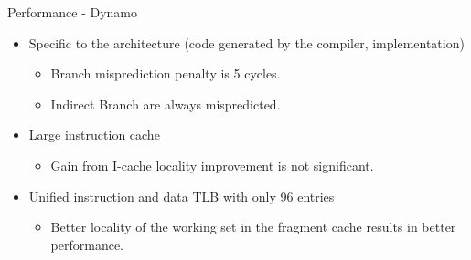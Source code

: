 \documentclass[aspectratio=169,xcolor=x11names]{beamer}
\begin{document}
	\begin{frame}{Performance - Dynamo}
		\begin{itemize}
			\item Specific to the architecture (code generated by the compiler, implementation)
			\begin{itemize}
				\item Branch misprediction penalty is 5 cycles.
				\item Indirect Branch are always mispredicted.
			\end{itemize}
			\item Large instruction cache
			\begin{itemize}
				\item Gain from I-cache locality improvement is not significant.
			\end{itemize}
			\item Unified instruction and data TLB with only 96 entries
			\begin{itemize}
				\item Better locality of the working set in the fragment cache results in better performance.
			\end{itemize}
		\end{itemize}
	\end{frame}
\end{document}
